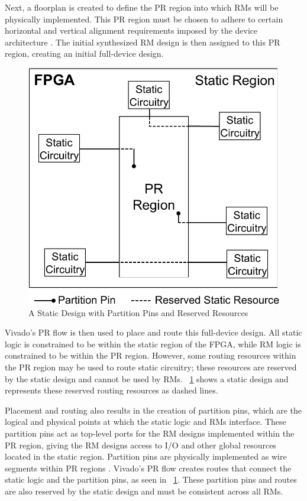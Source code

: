 Next, a floorplan is created to define the PR region into which RMs will be physically implemented.
This PR region must be chosen to adhere to certain horizontal and vertical alignment requirements imposed by the device architecture \cite{Xilinx:2018d}.
The initial synthesized RM design is then assigned to this PR region, creating an initial full-device design.

\begin{figure}
	\centering
	\includegraphics[width=.65\columnwidth]{figures/partPins.pdf}
	\caption{A Static Design with Partition Pins and Reserved Resources}
	\label{fig:partPins}
\end{figure}

Vivado's PR flow is then used to place and route this full-device design.
All static logic is constrained to be within the static region of the FPGA, while RM logic is constrained to be within the PR region.
However, some routing resources within the PR region may be used to route static circuitry; these resources are reserved by the static design and cannot be used by RMs.
\figurename~\ref{fig:partPins} shows a static design and represents these reserved routing resources as dashed lines.

Placement and routing also results in the creation of partition pins, which are the logical and physical points at which the static logic and RMs interface.
These partition pins act as top-level ports for the RM designs implemented within the PR region, giving the RM designs access to I/O and other global resources located in the static region.
Partition pins are physically implemented as wire segments within PR regions \cite{Xilinx:2018d}.
Vivado's PR flow creates routes that connect the static logic and the partition pins, as seen in \figurename~\ref{fig:partPins}.
These partition pins and routes are also reserved by the static design and must be consistent across all RMs.

